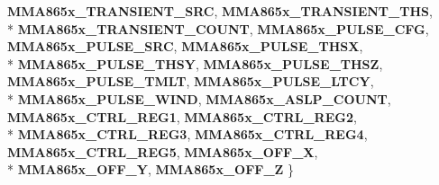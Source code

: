 \begin{DoxyCompactItemize}
{\bfseries M\+M\+A865x\+\_\+\+T\+R\+A\+N\+S\+I\+E\+N\+T\+\_\+\+S\+R\+C}, 
{\bfseries M\+M\+A865x\+\_\+\+T\+R\+A\+N\+S\+I\+E\+N\+T\+\_\+\+T\+H\+S}, 
\\*
{\bfseries M\+M\+A865x\+\_\+\+T\+R\+A\+N\+S\+I\+E\+N\+T\+\_\+\+C\+O\+U\+N\+T}, 
{\bfseries M\+M\+A865x\+\_\+\+P\+U\+L\+S\+E\+\_\+\+C\+F\+G}, 
{\bfseries M\+M\+A865x\+\_\+\+P\+U\+L\+S\+E\+\_\+\+S\+R\+C}, 
{\bfseries M\+M\+A865x\+\_\+\+P\+U\+L\+S\+E\+\_\+\+T\+H\+S\+X}, 
\\*
{\bfseries M\+M\+A865x\+\_\+\+P\+U\+L\+S\+E\+\_\+\+T\+H\+S\+Y}, 
{\bfseries M\+M\+A865x\+\_\+\+P\+U\+L\+S\+E\+\_\+\+T\+H\+S\+Z}, 
{\bfseries M\+M\+A865x\+\_\+\+P\+U\+L\+S\+E\+\_\+\+T\+M\+L\+T}, 
{\bfseries M\+M\+A865x\+\_\+\+P\+U\+L\+S\+E\+\_\+\+L\+T\+C\+Y}, 
\\*
{\bfseries M\+M\+A865x\+\_\+\+P\+U\+L\+S\+E\+\_\+\+W\+I\+N\+D}, 
{\bfseries M\+M\+A865x\+\_\+\+A\+S\+L\+P\+\_\+\+C\+O\+U\+N\+T}, 
{\bfseries M\+M\+A865x\+\_\+\+C\+T\+R\+L\+\_\+\+R\+E\+G1}, 
{\bfseries M\+M\+A865x\+\_\+\+C\+T\+R\+L\+\_\+\+R\+E\+G2}, 
\\*
{\bfseries M\+M\+A865x\+\_\+\+C\+T\+R\+L\+\_\+\+R\+E\+G3}, 
{\bfseries M\+M\+A865x\+\_\+\+C\+T\+R\+L\+\_\+\+R\+E\+G4}, 
{\bfseries M\+M\+A865x\+\_\+\+C\+T\+R\+L\+\_\+\+R\+E\+G5}, 
{\bfseries M\+M\+A865x\+\_\+\+O\+F\+F\+\_\+\+X}, 
\\*
{\bfseries M\+M\+A865x\+\_\+\+O\+F\+F\+\_\+\+Y}, 
{\bfseries M\+M\+A865x\+\_\+\+O\+F\+F\+\_\+\+Z}
 \}\label{group___engduino_accelerometer_ga06fc87d81c62e9abb8790b6e5713c55b}

\end{DoxyCompactItemize}
